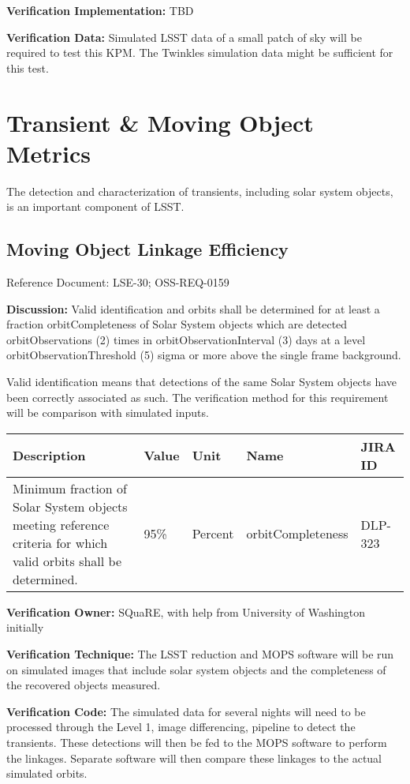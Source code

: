 \textbf{Verification Implementation:} TBD

\textbf{Verification Data:} Simulated LSST data of a small patch of sky
will be required to test this KPM. The Twinkles simulation data might be
sufficient for this test.

\section{Transient \& Moving Object
Metrics}\label{transient-moving-object-metrics}

The detection and characterization of transients, including solar system
objects, is an important component of LSST.

\subsection{Moving Object Linkage
Efficiency}\label{moving-object-linkage-efficiency}

Reference Document: LSE-30; OSS-REQ-0159

\textbf{Discussion:} Valid identification and orbits shall be determined
for at least a fraction orbitCompleteness of Solar System objects which
are detected orbitObservations (2) times in orbitObservationInterval (3)
days at a level orbitObservationThreshold (5) sigma or more above the
single frame background.

Valid identification means that detections of the same Solar System
objects have been correctly associated as such. The verification method
for this requirement will be comparison with simulated inputs.

\begin{longtable}[]{@{}lllll@{}}
\toprule
Description & Value & Unit & Name & JIRA ID\tabularnewline
\midrule
\endhead
Minimum fraction of Solar System objects meeting reference criteria for
which valid orbits shall be determined. & 95\% & Percent &
orbitCompleteness & DLP-323\tabularnewline
\bottomrule
\end{longtable}

\textbf{Verification Owner:} SQuaRE, with help from University of
Washington initially

\textbf{Verification Technique:} The LSST reduction and MOPS software
will be run on simulated images that include solar system objects and
the completeness of the recovered objects measured.

\textbf{Verification Code:} The simulated data for several nights will
need to be processed through the Level 1, image differencing, pipeline
to detect the transients. These detections will then be fed to the MOPS
software to perform the linkages. Separate software will then compare
these linkages to the actual simulated orbits.

